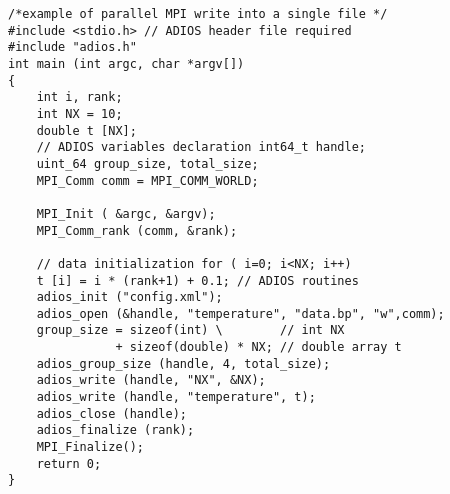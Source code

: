 \begin{lstlisting}[alsolanguage=C,caption={ADIOS programming example.},label={list-adios-prog-example}]
/*example of parallel MPI write into a single file */ 
#include <stdio.h> // ADIOS header file required 
#include "adios.h"
int main (int argc, char *argv[])
{    
    int i, rank; 
    int NX = 10;
    double t [NX];
    // ADIOS variables declaration int64_t handle;
    uint_64 group_size, total_size;
    MPI_Comm comm = MPI_COMM_WORLD; 
    
    MPI_Init ( &argc, &argv);
    MPI_Comm_rank (comm, &rank);

    // data initialization for ( i=0; i<NX; i++)
    t [i] = i * (rank+1) + 0.1; // ADIOS routines 
    adios_init ("config.xml");
    adios_open (&handle, "temperature", "data.bp", "w",comm); 
    group_size = sizeof(int) \        // int NX
               + sizeof(double) * NX; // double array t
    adios_group_size (handle, 4, total_size);
    adios_write (handle, "NX", &NX);
    adios_write (handle, "temperature", t); 
    adios_close (handle);
    adios_finalize (rank);
    MPI_Finalize(); 
    return 0;
}
\end{lstlisting}
